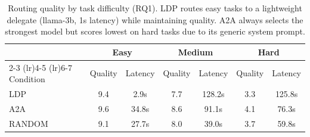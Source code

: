 \begin{table}[t]
\centering
\caption{Routing quality by task difficulty (RQ1). LDP routes easy tasks to a lightweight delegate (llama-3b, 1s latency) while maintaining quality. A2A always selects the strongest model but scores lowest on hard tasks due to its generic system prompt.}
\label{tab:routing-difficulty}
\begin{tabular}{lcccccc}
\toprule
& \multicolumn{2}{c}{Easy} & \multicolumn{2}{c}{Medium} & \multicolumn{2}{c}{Hard} \\
\cmidrule(lr){2-3} \cmidrule(lr){4-5} \cmidrule(lr){6-7}
Condition & Quality & Latency & Quality & Latency & Quality & Latency \\
\midrule
LDP & 9.4 & 2.9s & 7.7 & 128.2s & 3.3 & 125.8s \\
A2A & 9.6 & 34.8s & 8.6 & 91.1s & 4.1 & 76.3s \\
RANDOM & 9.1 & 27.7s & 8.0 & 39.0s & 3.7 & 59.8s \\
\bottomrule
\end{tabular}
\end{table}